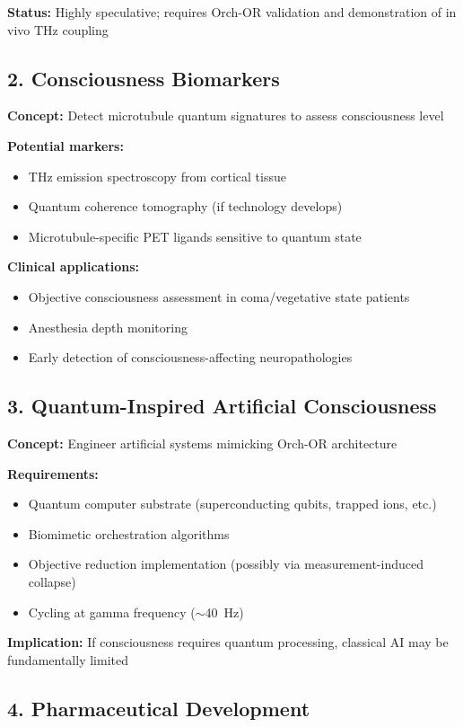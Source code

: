 \textbf{Status:} Highly speculative; requires Orch-OR validation and demonstration of in vivo THz coupling

\subsection{2. Consciousness Biomarkers}

\textbf{Concept:} Detect microtubule quantum signatures to assess consciousness level

\textbf{Potential markers:}
\begin{itemize}
\item THz emission spectroscopy from cortical tissue
\item Quantum coherence tomography (if technology develops)
\item Microtubule-specific PET ligands sensitive to quantum state
\end{itemize}

\textbf{Clinical applications:}
\begin{itemize}
\item Objective consciousness assessment in coma/vegetative state patients
\item Anesthesia depth monitoring
\item Early detection of consciousness-affecting neuropathologies
\end{itemize}

\subsection{3. Quantum-Inspired Artificial Consciousness}

\textbf{Concept:} Engineer artificial systems mimicking Orch-OR architecture

\textbf{Requirements:}
\begin{itemize}
\item Quantum computer substrate (superconducting qubits, trapped ions, etc.)
\item Biomimetic orchestration algorithms
\item Objective reduction implementation (possibly via measurement-induced collapse)
\item Cycling at gamma frequency ($\sim$40~Hz)
\end{itemize}

\textbf{Implication:} If consciousness requires quantum processing, classical AI may be fundamentally limited

\subsection{4. Pharmaceutical Development}

